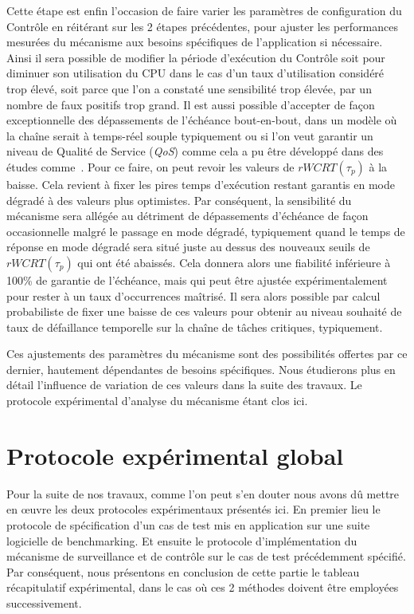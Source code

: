 \documentclass[french, a4paper, 11pt, twoside, pdftex]{StyleThese}
\begin{document}
		 Cette étape est enfin l'occasion de faire varier les paramètres de configuration du Contrôle en réitérant sur les 2 étapes précédentes, pour ajuster les performances mesurées du mécanisme aux besoins spécifiques de l'application si nécessaire. Ainsi il sera possible de modifier la période d'exécution du Contrôle soit  pour diminuer son utilisation du CPU dans le cas d'un taux d'utilisation considéré trop élevé, soit parce que l'on a constaté une sensibilité trop élevée, par un nombre de faux positifs trop grand.
		 Il est aussi possible d'accepter de façon exceptionnelle des dépassements de l'échéance bout-en-bout, dans un modèle où la chaîne serait à temps-réel souple typiquement ou si l'on veut garantir un niveau de Qualité de Service (\textit{QoS}) comme cela a pu être développé dans des études comme~\cite{lin_maximizing_2006}. Pour ce faire, on peut revoir les valeurs de $rWCRT(\tau_p)$ à la baisse. Cela revient à fixer les pires temps d'exécution restant garantis en mode dégradé à des valeurs plus optimistes. Par conséquent, la sensibilité du mécanisme sera allégée au détriment de dépassements d'échéance de façon occasionnelle malgré le passage en mode dégradé, typiquement quand le temps de réponse en mode dégradé sera situé juste au dessus des nouveaux seuils de $rWCRT(\tau_p)$ qui ont été abaissés. Cela donnera alors une fiabilité inférieure à 100\% de garantie de l'échéance, mais qui peut être ajustée expérimentalement pour rester à un taux d'occurrences maîtrisé. Il sera alors possible par calcul probabiliste de fixer une baisse de ces valeurs pour obtenir au niveau souhaité de taux de défaillance temporelle sur la chaîne de tâches critiques, typiquement.
		 
		 Ces ajustements des paramètres du mécanisme sont des possibilités offertes par ce dernier, hautement dépendantes de besoins spécifiques. Nous étudierons plus en détail l'influence de variation de ces valeurs dans la suite des travaux. Le protocole expérimental d'analyse du mécanisme étant clos ici.    	
                	
                	
\section{Protocole expérimental global}
    
    Pour la suite de nos travaux, comme l'on peut s'en douter nous avons dû mettre en œuvre les deux protocoles expérimentaux présentés ici. En premier lieu le protocole de spécification d'un cas de test mis en application sur une suite logicielle de benchmarking. Et ensuite le protocole d'implémentation du mécanisme de surveillance et de contrôle sur le cas de test précédemment spécifié. Par conséquent, nous présentons en conclusion de cette partie le tableau récapitulatif expérimental, dans le cas où ces 2 méthodes doivent être employées successivement.
    
\end{document}
